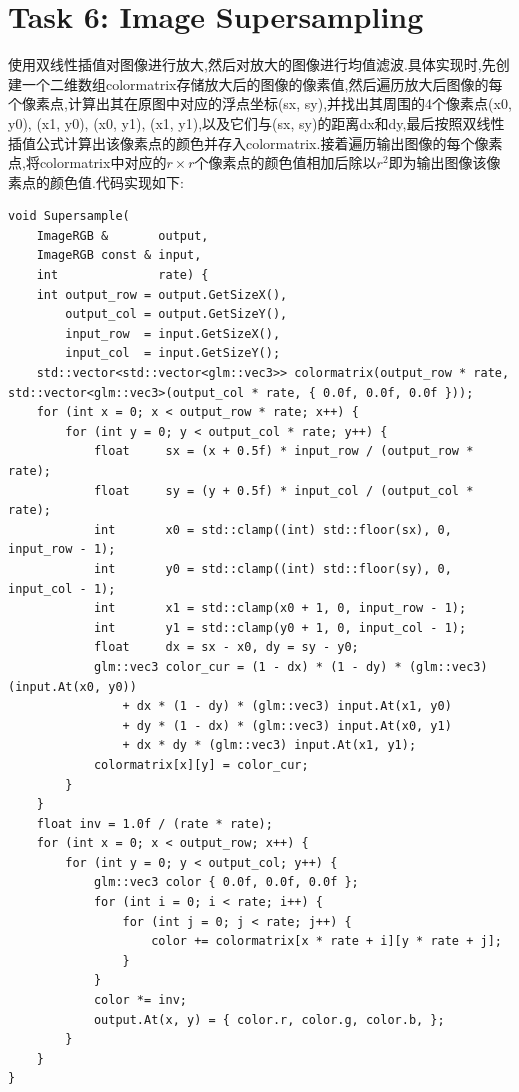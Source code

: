 \documentclass{ctexart}
\begin{document}
\section*{Task 6: Image Supersampling}
使用双线性插值对图像进行放大,然后对放大的图像进行均值滤波.具体实现时,先创建一个二维数组{\codefont colormatrix}存储放大后的图像的像素值,然后遍历放大后图像的每个像素点,计算出其在原图中对应的浮点坐标{\codefont (sx, sy)},并找出其周围的4个像素点{\codefont (x0, y0), (x1, y0), (x0, y1), (x1, y1)},以及它们与{\codefont (sx, sy)}的距离{\codefont dx}和{\codefont dy},最后按照双线性插值公式计算出该像素点的颜色并存入{\codefont colormatrix}.接着遍历输出图像的每个像素点,将{\codefont colormatrix}中对应的$r\times r$个像素点的颜色值相加后除以$r^2$即为输出图像该像素点的颜色值.代码实现如下:
\begin{lstlisting}
void Supersample(
    ImageRGB &       output,
    ImageRGB const & input,
    int              rate) {
    int output_row = output.GetSizeX(),
        output_col = output.GetSizeY(),
        input_row  = input.GetSizeX(),
        input_col  = input.GetSizeY();
    std::vector<std::vector<glm::vec3>> colormatrix(output_row * rate, std::vector<glm::vec3>(output_col * rate, { 0.0f, 0.0f, 0.0f }));
    for (int x = 0; x < output_row * rate; x++) {
        for (int y = 0; y < output_col * rate; y++) {
            float     sx = (x + 0.5f) * input_row / (output_row * rate);
            float     sy = (y + 0.5f) * input_col / (output_col * rate);
            int       x0 = std::clamp((int) std::floor(sx), 0, input_row - 1);
            int       y0 = std::clamp((int) std::floor(sy), 0, input_col - 1);
            int       x1 = std::clamp(x0 + 1, 0, input_row - 1);
            int       y1 = std::clamp(y0 + 1, 0, input_col - 1);
            float     dx = sx - x0, dy = sy - y0;
            glm::vec3 color_cur = (1 - dx) * (1 - dy) * (glm::vec3)(input.At(x0, y0)) 
                + dx * (1 - dy) * (glm::vec3) input.At(x1, y0)
                + dy * (1 - dx) * (glm::vec3) input.At(x0, y1)
                + dx * dy * (glm::vec3) input.At(x1, y1);
            colormatrix[x][y] = color_cur;
        }
    }
    float inv = 1.0f / (rate * rate);
    for (int x = 0; x < output_row; x++) {
        for (int y = 0; y < output_col; y++) {
            glm::vec3 color { 0.0f, 0.0f, 0.0f };
            for (int i = 0; i < rate; i++) {
                for (int j = 0; j < rate; j++) {
                    color += colormatrix[x * rate + i][y * rate + j];
                }
            }
            color *= inv;
            output.At(x, y) = { color.r, color.g, color.b, };
        }
    }
}
\end{lstlisting}
\end{document}
